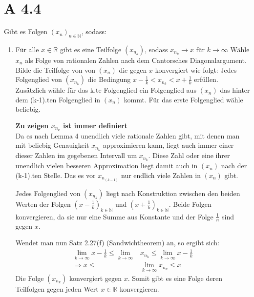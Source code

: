 \documentclass{article}
\begin{document}
    \section*{A 4.4}
        Gibt es Folgen \( {(x_n)}_{n \in \mathbb{N}} \), sodass:
        \begin{enumerate}[ label = (\roman*)]
            \item Für alle \( x \in \mathbb{R} \) gibt es eine Teilfolge \( (x_{n_k}) \), sodass \(x_{n_k} \to x\) für \( k \to \infty \)
            Wähle \(x_n\) als Folge von rationalen Zahlen nach dem Cantorsches Diagonalargument.
            Bilde die Teilfolge von von \((x_n)\) die gegen \(x\) konvergiert wie folgt:
            Jedes Folgenglied von \( (x_{n_k}) \) die Bedingung \( x - \frac{1}{k} < x_{n_k} < x + \frac{1}{k} \) erfüllen.
            Zusätzlich wähle für das k.te Folgenglied ein Folgenglied aus \((x_n)\) das hinter dem (k-1).ten Folgenglied in \((x_n)\) kommt.
            Für das erste Folgenglied wähle beliebig.

            \textbf{Zu zeigen \(x_{n_k}\) ist immer definiert} \\
            Da es nach Lemma 4 unendlich viele rationale Zahlen gibt, mit denen man mit beliebig Genauigkeit \( x_{n_k} \) approximieren kann,
            liegt auch immer einer dieser Zahlen im gegebenen Intervall um \( x_{n_k} \). Diese Zahl oder eine ihrer unendlich vielen
            besseren Approximation liegt damit auch in \( (x_n) \) nach der (k-1).ten Stelle. Das es vor \(x_{n_{(k-1)}}\) nur endlich viele Zahlen in \( (x_n) \) gibt.

            Jedes Folgenglied von \((x_{n_k})\) liegt nach Konstruktion zwischen den beiden Werten der Folgen
            \( {(x - \frac{1}{k}) }_{k \in \mathbb{N}}\) und \( { (x + \frac{1}{k}) }_{k \in \mathbb{N}} \).
            Beide Folgen konvergieren, da sie nur eine Summe aus Konstante und der Folge \(\frac{1}{n}\) sind gegen \(x\).

            Wendet man nun Satz 2.27(f) (Sandwichtheorem) an, so ergibt sich:
            \begin{align*}
                \lim_{k \to \infty} x - \frac{1}{k} \leq \lim_{k \to \infty} &x_{n_k} \leq \lim_{k \to \infty} x - \frac{1}{k} \\
                \Rightarrow x \leq &\lim_{k \to \infty} x_{n_k} \leq x
            \end{align*}
            Die Folge \((x_{n_k})\) konvergiert gegen \(x\).
            Somit gibt es eine Folge deren Teilfolgen gegen jeden Wert \( x \in \mathbb{R} \) konvergieren.
            

\end{enumerate}
\end{document}
